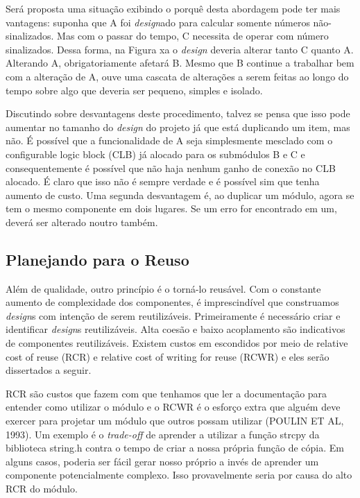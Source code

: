 Será proposta uma situação exibindo o porquê desta abordagem pode ter mais vantagens: suponha que A foi \textit{design}ado para calcular somente números não-sinalizados. Mas com o passar do tempo, C necessita de operar com número sinalizados. Dessa forma, na Figura xa o \textit{design} deveria alterar tanto C quanto A. Alterando A, obrigatoriamente afetará B. Mesmo que B continue a trabalhar bem com a alteração de A, ouve uma cascata de alterações a serem feitas ao longo do tempo sobre algo que deveria ser pequeno, simples e isolado.

Discutindo sobre desvantagens deste procedimento, talvez se pensa que isso pode aumentar no tamanho do \textit{design} do projeto já que está duplicando um item, mas não. É possível que a funcionalidade de A seja simplesmente mesclado com o configurable logic block (CLB) já alocado para os submódulos B e C e consequentemente é possível que não haja nenhum ganho de conexão no CLB alocado. É claro que isso não é sempre verdade e é possível sim que tenha aumento de custo. Uma segunda desvantagem é, ao duplicar um módulo, agora se tem o mesmo componente em dois lugares. Se um erro for encontrado em um, deverá ser alterado noutro também.

\subsection{Planejando para o Reuso}

Além de qualidade, outro princípio é o torná-lo reusável. Com o constante aumento de complexidade dos componentes, é imprescindível que construamos \textit{design}s com intenção de serem reutilizáveis. Primeiramente é necessário criar e identificar \textit{design}s reutilizáveis. Alta coesão e baixo acoplamento são indicativos de componentes reutilizáveis. Existem custos em escondidos por meio de relative cost of reuse (RCR) e relative cost of writing for reuse (RCWR) e eles serão dissertados a seguir.

RCR são custos que fazem com que tenhamos que ler a documentação para entender como utilizar o módulo e o RCWR é o esforço extra que alguém deve exercer para projetar um módulo que outros possam utilizar (POULIN ET AL, 1993). Um exemplo é o \textit{trade-off} de aprender a utilizar a função strcpy da biblioteca string.h contra o tempo de criar a nossa própria função de cópia. Em alguns casos, poderia ser fácil gerar nosso próprio a invés de aprender um componente potencialmente complexo. Isso provavelmente seria por causa do alto RCR do módulo.

